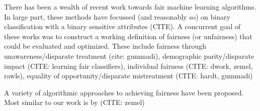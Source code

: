 There has been a wealth of recent work towards fair machine learning algorithms. In large part, these methods have focussed (and reasonably so) on binary classification with a binary sensitive attributes (CITE). A concurrent goal of these works was to construct a working definition of fairness (or unfairness) that could be evaluated and optimized. These include fairness through unawareness/disparate treatment (cite: gummadi), demographic parity/disparate impact (CITE: learning fair classifiers), individual fairness (CITE: dwork, zemel, rawls), equality of opportunity/disparate mistreatment (CITE: hardt, gummadi)

A variety of algorithmic approaches to achieving fairness have been proposed. Most similar to our work is by (CITE: zemel)






